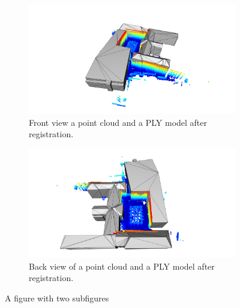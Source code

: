         
        \begin{figure}[H]
            \centering
            \begin{subfigure}{1\textwidth}
                \centering
                \includegraphics[scale=0.2]{images/solution_images/final_ply_a.png}
                \caption{Front view a point cloud and a PLY model after registration.}
                \label{fig:final_ply_a}
            \end{subfigure}
            \hfill
            \begin{subfigure}{1\textwidth}
                \centering
                \includegraphics[scale=0.2]{images/solution_images/final_ply_b.png}
                \caption{Back view of a point cloud and a PLY model after registration.}
                \label{fig:final_ply_b}
            \end{subfigure}
            \caption{A figure with two subfigures}
            \label{fig:final_ply}
        \end{figure}


    

